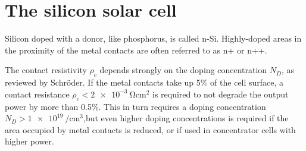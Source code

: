 \documentclass[11pt,bibliography=totoc,index=totoc]{scrbook}   %
\begin{document}




%
\section{The silicon solar cell}\label{sec:SiliconSolarCell}
%

Silicon doped with a donor, like phosphorus, is called n-Si. Highly-doped areas in the proximity of the metal contacts are often referred to as n+ or n++.

The contact resistivity $\rho_c$ depends strongly on the doping concentration $N_D$, as reviewed by Schröder\cite{Schroder:1984}. 
If the metal contacts take up 5\% of the cell surface, a contact resistance $\rho_c < \SI{2e-3}{\ohm\centi\metre\squared}$ is required to not degrade the output power by more than 0.5\%. This in turn requires a doping concentration $N_D > \SI{1e19}{\per\centi\metre\cubed}$,but even higher doping concentrations is required if the area occupied by metal contacts is reduced, or if used in concentrator cells with higher power.


\end{document}
